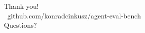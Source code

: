\documentclass[aspectratio=169]{beamer}
\begin{document}
\begin{frame}[standout]
  Thank you! \\
  \vspace{2mm}
  \large\faGithub\ github.com/konradcinkusz/agent-eval-bench \\
  \vspace{2mm}
  Questions?
\end{frame}
\end{document}
